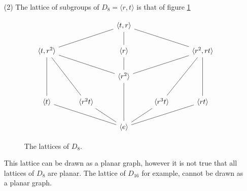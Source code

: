 \begin{example}
\begin{enumerate}
    \item[(2)] The lattice of subgroups of $D_8=\langle r, t \rangle$ is that of
      figure \ref{figure_2.2}
      \begin{figure}[h]
        \[\begin{tikzcd}
  && {\langle t,r \rangle} \\
          {\langle t,r^2 \rangle} && {\langle r \rangle} && {\langle r^2,rt \rangle} \\
                                  && {\langle r^2 \rangle} \\
          {\langle t \rangle} & {\langle r^2t \rangle} && {\langle r^3t \rangle} & {\langle rt \rangle} \\
                              && {\langle e \rangle}
                              \arrow[no head, from=1-3, to=2-1]
                              \arrow[no head, from=2-1, to=3-3]
                              \arrow[no head, from=3-3, to=2-5]
                              \arrow[no head, from=2-5, to=1-3]
                              \arrow[no head, from=1-3, to=2-3]
                              \arrow[no head, from=2-3, to=3-3]
                              \arrow[no head, from=3-3, to=5-3]
                              \arrow[no head, from=2-1, to=4-1]
                              \arrow[no head, from=4-1, to=5-3]
                              \arrow[no head, from=5-3, to=4-5]
                              \arrow[no head, from=4-5, to=2-5]
                              \arrow[no head, from=2-5, to=4-4]
                              \arrow[no head, from=4-4, to=5-3]
                              \arrow[no head, from=5-3, to=4-2]
                              \arrow[no head, from=4-2, to=2-1]
        \end{tikzcd}\]
        \caption{The lattices of $D_8$.}
        \label{figure_2.2}
      \end{figure}
      This lattice can be drawn as a planar graph, however it is not true
      that all lattices of $D_8$ are planar. The lattice of $D_{16}$
      for example, cannot be drawn as a planar graph.


\end{enumerate}
\end{example}
